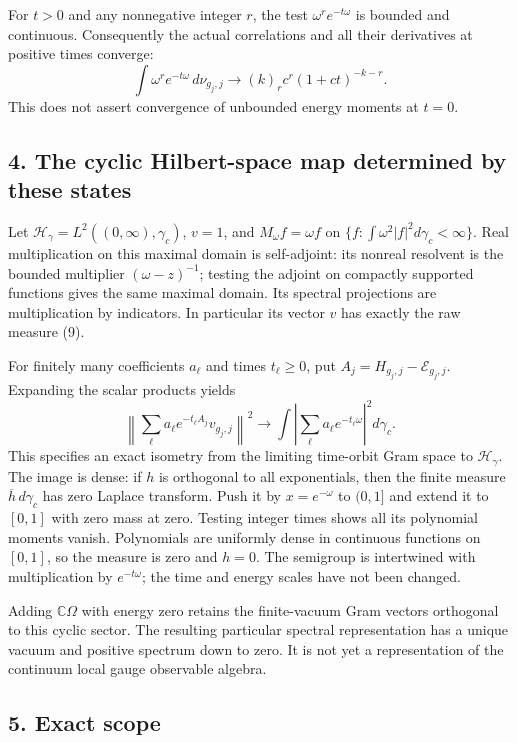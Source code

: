\documentclass[
  11pt,
]{article}
\begin{document}
For \(t>0\) and any nonnegative integer \(r\), the test
\(\omega^r e^{-t\omega}\) is bounded and continuous. Consequently the
actual correlations and all their derivatives at positive times
converge: \[
 \int\omega^r e^{-t\omega}\,d\nu_{g_j,j}
 \longrightarrow
 (k)_r c^r(1+ct)^{-k-r}.
\] This does not assert convergence of unbounded energy moments at
\(t=0\).

\subsection{4. The cyclic Hilbert-space map determined by these
states}\label{weak-coupling-part-4-the-cyclic-hilbert-space-map-determined-by-these-states}

Let \(\mathcal H_\gamma=L^2((0,\infty),\gamma_c)\), \(v=1\), and
\(M_\omega f=\omega f\) on \(\{f:\int\omega^2|f|^2d\gamma_c<\infty\}\).
Real multiplication on this maximal domain is self-adjoint: its nonreal
resolvent is the bounded multiplier \((\omega-z)^{-1}\); testing the
adjoint on compactly supported functions gives the same maximal domain.
Its spectral projections are multiplication by indicators. In particular
its vector \(v\) has exactly the raw measure (9).

For finitely many coefficients \(a_\ell\) and times \(t_\ell\ge0\), put
\(A_j=H_{g_j,j}-\mathcal E_{g_j,j}\). Expanding the scalar products
yields \[
 \left\|\sum_\ell a_\ell e^{-t_\ell A_j}v_{g_j,j}\right\|^2
 \longrightarrow
 \int\left|\sum_\ell a_\ell e^{-t_\ell\omega}\right|^2d\gamma_c .
\] This specifies an exact isometry from the limiting time-orbit Gram
space to \(\mathcal H_\gamma\). The image is dense: if \(h\) is
orthogonal to all exponentials, then the finite measure
\(\overline h\,d\gamma_c\) has zero Laplace transform. Push it by
\(x=e^{-\omega}\) to \((0,1]\) and extend it to \([0,1]\) with zero mass
at zero. Testing integer times shows all its polynomial moments vanish.
Polynomials are uniformly dense in continuous functions on \([0,1]\), so
the measure is zero and \(h=0\). The semigroup is intertwined with
multiplication by \(e^{-t\omega}\); the time and energy scales have not
been changed.

Adding \(\mathbb C\Omega\) with energy zero retains the finite-vacuum
Gram vectors orthogonal to this cyclic sector. The resulting particular
spectral representation has a unique vacuum and positive spectrum down
to zero. It is not yet a representation of the continuum local gauge
observable algebra.

\subsection{5. Exact scope}\label{weak-coupling-part-4-exact-scope}
\end{document}

